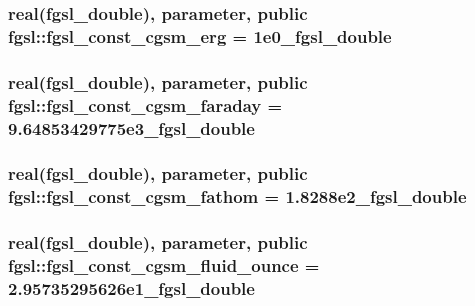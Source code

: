 \hypertarget{classfgsl_aa30f1017800c569944ad894fff2ae006}{
\subsubsection[{fgsl\-\_\-const\-\_\-cgsm\-\_\-erg}]{\setlength{\rightskip}{0pt plus 5cm}real({\bf fgsl\-\_\-double}), parameter, public fgsl\-::fgsl\-\_\-const\-\_\-cgsm\-\_\-erg = 1e0\-\_\-fgsl\-\_\-double}}\label{classfgsl_aa30f1017800c569944ad894fff2ae006}
\hypertarget{classfgsl_a147d94db9ca3b698ccb636b75b27484e}{
\subsubsection[{fgsl\-\_\-const\-\_\-cgsm\-\_\-faraday}]{\setlength{\rightskip}{0pt plus 5cm}real({\bf fgsl\-\_\-double}), parameter, public fgsl\-::fgsl\-\_\-const\-\_\-cgsm\-\_\-faraday = 9.\-64853429775e3\-\_\-fgsl\-\_\-double}}\label{classfgsl_a147d94db9ca3b698ccb636b75b27484e}
\hypertarget{classfgsl_a8351533377c64da8b76317b3172c1c76}{
\subsubsection[{fgsl\-\_\-const\-\_\-cgsm\-\_\-fathom}]{\setlength{\rightskip}{0pt plus 5cm}real({\bf fgsl\-\_\-double}), parameter, public fgsl\-::fgsl\-\_\-const\-\_\-cgsm\-\_\-fathom = 1.\-8288e2\-\_\-fgsl\-\_\-double}}\label{classfgsl_a8351533377c64da8b76317b3172c1c76}
\hypertarget{classfgsl_ada803a980994f045ecc9fa32cebad23b}{
\subsubsection[{fgsl\-\_\-const\-\_\-cgsm\-\_\-fluid\-\_\-ounce}]{\setlength{\rightskip}{0pt plus 5cm}real({\bf fgsl\-\_\-double}), parameter, public fgsl\-::fgsl\-\_\-const\-\_\-cgsm\-\_\-fluid\-\_\-ounce = 2.\-95735295626e1\-\_\-fgsl\-\_\-double}}\label{classfgsl_ada803a980994f045ecc9fa32cebad23b}

